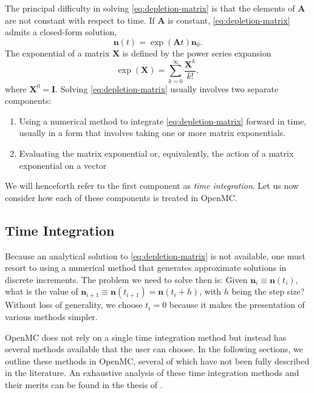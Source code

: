 \documentclass[3p,authoryear]{elsarticle}
\newcommand{\vect}[1]{\mathbf{#1}} %
\begin{document}
The principal difficulty in solving \cref{eq:depletion-matrix} is that
the elements of $\vect{A}$ are not constant with respect to time. If
$\vect{A}$ is constant, \cref{eq:depletion-matrix} admits a closed-form
solution,
\begin{equation}
  \label{eq:constant-A}
  \vect{n}(t) = \exp \left (\vect{A} t \right ) \vect{n}_0.
\end{equation}
The exponential of a matrix $\vect{X}$ is defined by the power series
expansion
\begin{equation}
  \exp(\vect{X}) = \sum\limits_{k=0}^\infty \frac{\vect{X}^k}{k!},
\end{equation}
where $\vect{X}^0 = \vect{I}$. Solving \cref{eq:depletion-matrix} usually
involves two separate components:
\begin{enumerate}
  \item Using a numerical method to integrate \cref{eq:depletion-matrix}
  forward in time, usually in a form that involves taking one or more matrix
  exponentials.
  \item Evaluating the matrix exponential or, equivalently, the action of a
  matrix exponential on a vector
\end{enumerate}
We will henceforth refer to the first component as \emph{time integration}. Let
us now consider how each of these components is treated in OpenMC.

\subsection{Time Integration}
\label{sec:time_integration}

Because an analytical solution to \cref{eq:depletion-matrix} is not available,
one must resort to using a numerical method that generates approximate solutions
in discrete increments. The problem we need to solve then is: Given $\vect{n}_i
\equiv \vect{n}(t_i)$, what is the value of $\vect{n}_{i+1} \equiv
\vect{n}(t_{i+1}) = \vect{n}(t_i + h)$, with $h$ being the step size? Without
loss of generality, we  choose $t_i=0$ because it makes the presentation of
various methods simpler.

OpenMC does not rely on a single time integration method but instead has several
methods available that the user can choose. In the following sections, we
outline these methods in OpenMC, several of which have not been fully described
in the literature. An exhaustive analysis of these time integration methods and
their merits can be found in the thesis of \citet{josey2017phd}.
\end{document}
